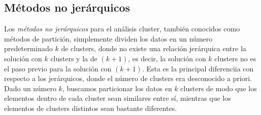 \subsection{Métodos no jerárquicos}

Los \textit{métodos no jerárquicos} para el análisis cluster, también conocidos como métodos de partición, simplemente dividen los datos en un número predeterminado $k$
de clusters, donde no existe una relación jerárquica entre la solución con $k$ clusters y la de $(k+1)$, es decir, la solución con $k$ clusters no es el paso previo para
la solución con $(k+1)$. Esta es la principal diferenciia con respecto a los jerárquicos, donde el número de clusters era desconocido a priori. \newline
Dado un número $k$, buscamos particionar los datos en $k$ clusters de modo que los elementos dentro de cada cluster sean similares entre sí, mientras que los elementos 
de clusters distintos sean bastante diferentes. 


